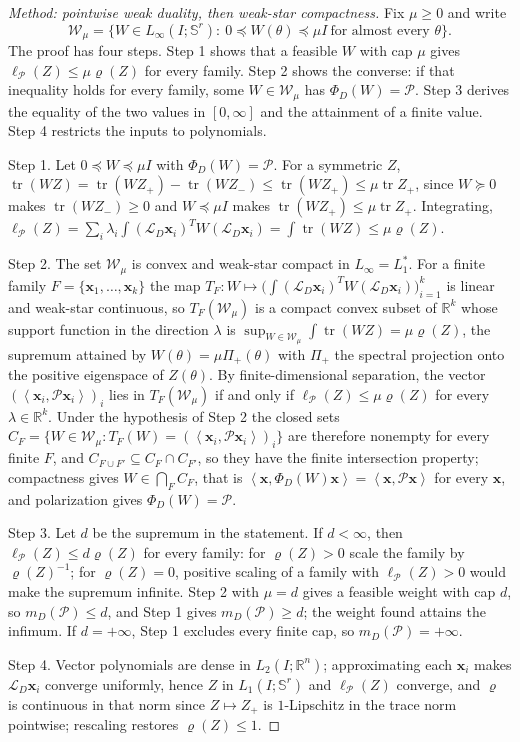 \documentclass[12pt]{article}
\newcommand{\R}{\mathbb{R}}
\newcommand{\Sym}[1]{\mathbb{S}^{#1}}
\newcommand{\mcl}[1]{\mathcal{#1}}
\newcommand{\mbf}[1]{\mathbf{#1}}
\newcommand{\ip}[2]{\left\langle #1,#2\right\rangle}
\DeclareMathOperator{\tr}{tr}
\theoremstyle{plain}
\theoremstyle{definition}
\theoremstyle{remark}
\begin{document}
\begin{proof}[Method: pointwise weak duality, then weak-star compactness]
Fix $\mu\ge0$ and write
\[
\mcl W_\mu=\{W\in L_\infty(I;\Sym r):\ 0\preceq W(\theta)\preceq\mu I\ \text{for almost every }\theta\}.
\]
The proof has four steps. Step 1 shows that a feasible $W$ with cap $\mu$ gives $\ell_{\mcl P}(Z)\le\mu\varrho(Z)$ for every family. Step 2 shows the converse: if that inequality holds for every family, some $W\in\mcl W_\mu$ has $\Phi_D(W)=\mcl P$. Step 3 derives the equality of the two values in $[0,\infty]$ and the attainment of a finite value. Step 4 restricts the inputs to polynomials.

Step 1. Let $0\preceq W\preceq\mu I$ with $\Phi_D(W)=\mcl P$. For a symmetric $Z$, $\tr(WZ)=\tr(WZ_+)-\tr(WZ_-)\le\tr(WZ_+)\le\mu\tr Z_+$, since $W\succeq0$ makes $\tr(WZ_-)\ge0$ and $W\preceq\mu I$ makes $\tr(WZ_+)\le\mu\tr Z_+$. Integrating, $\ell_{\mcl P}(Z)=\sum_i\lambda_i\int(\mcl L_D\mbf x_i)^TW(\mcl L_D\mbf x_i)=\int\tr(WZ)\le\mu\varrho(Z)$.

Step 2. The set $\mcl W_\mu$ is convex and weak-star compact in $L_\infty=L_1^*$. For a finite family $F=\{\mbf x_1,\dots,\mbf x_k\}$ the map $T_F:W\mapsto\bigl(\int(\mcl L_D\mbf x_i)^TW(\mcl L_D\mbf x_i)\bigr)_{i=1}^k$ is linear and weak-star continuous, so $T_F(\mcl W_\mu)$ is a compact convex subset of $\R^k$ whose support function in the direction $\lambda$ is $\sup_{W\in\mcl W_\mu}\int\tr(WZ)=\mu\varrho(Z)$, the supremum attained by $W(\theta)=\mu\Pi_+(\theta)$ with $\Pi_+$ the spectral projection onto the positive eigenspace of $Z(\theta)$. By finite-dimensional separation, the vector $(\ip{\mbf x_i}{\mcl P\mbf x_i})_i$ lies in $T_F(\mcl W_\mu)$ if and only if $\ell_{\mcl P}(Z)\le\mu\varrho(Z)$ for every $\lambda\in\R^k$. Under the hypothesis of Step 2 the closed sets $C_F=\{W\in\mcl W_\mu:T_F(W)=(\ip{\mbf x_i}{\mcl P\mbf x_i})_i\}$ are therefore nonempty for every finite $F$, and $C_{F\cup F'}\subseteq C_F\cap C_{F'}$, so they have the finite intersection property; compactness gives $W\in\bigcap_FC_F$, that is $\ip{\mbf x}{\Phi_D(W)\mbf x}=\ip{\mbf x}{\mcl P\mbf x}$ for every $\mbf x$, and polarization gives $\Phi_D(W)=\mcl P$.

Step 3. Let $d$ be the supremum in the statement. If $d<\infty$, then $\ell_{\mcl P}(Z)\le d\varrho(Z)$ for every family: for $\varrho(Z)>0$ scale the family by $\varrho(Z)^{-1}$; for $\varrho(Z)=0$, positive scaling of a family with $\ell_{\mcl P}(Z)>0$ would make the supremum infinite. Step 2 with $\mu=d$ gives a feasible weight with cap $d$, so $m_D(\mcl P)\le d$, and Step 1 gives $m_D(\mcl P)\ge d$; the weight found attains the infimum. If $d=+\infty$, Step 1 excludes every finite cap, so $m_D(\mcl P)=+\infty$.

Step 4. Vector polynomials are dense in $L_2(I;\R^n)$; approximating each $\mbf x_i$ makes $\mcl L_D\mbf x_i$ converge uniformly, hence $Z$ in $L_1(I;\Sym r)$ and $\ell_{\mcl P}(Z)$ converge, and $\varrho$ is continuous in that norm since $Z\mapsto Z_+$ is $1$-Lipschitz in the trace norm pointwise; rescaling restores $\varrho(Z)\le1$.
\end{proof}
\end{document}
